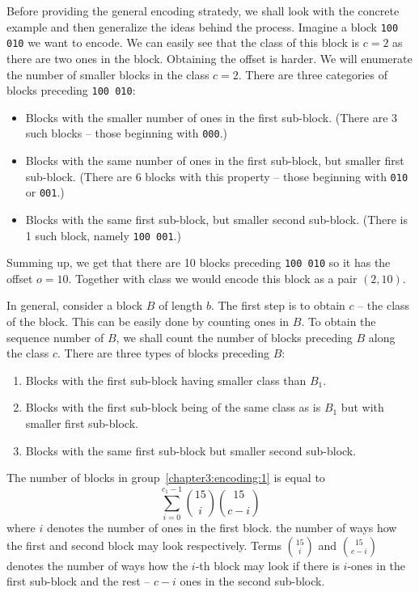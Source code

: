 Before providing the general encoding stratedy, we shall look with the concrete example and then generalize
the ideas behind the process. Imagine a block {\tt 100 010} we want to encode. We can easily see that the
class of this block is $c=2$ as there are two ones in the block. Obtaining the offset is harder. We will
enumerate the number of smaller blocks in the class $c=2$. There are three categories of blocks
preceding {\tt 100 010}:

\begin{itemize}
    \item Blocks with the smaller number of ones in the first sub-block.
    (There are 3 such blocks -- those beginning with {\tt 000}.)
    \item Blocks with the same number of ones in the first sub-block, but smaller first sub-block.
    (There are 6 blocks with this property -- those beginning with {\tt 010} or {\tt 001}.)
    \item Blocks with the same first sub-block, but smaller second sub-block.
    (There is 1 such block, namely {\tt 100 001}.)
\end{itemize}

Summing up, we get that there are 10 blocks preceding {\tt 100 010} so it has the offset $o=10$. Together
with class we would encode this block as a pair $(2, 10)$. 

In general, consider a block $B$ of length $b$. The first step is to obtain $c$ -- the class of the block.
This can be easily done by counting ones in $B$. To obtain the sequence number of $B$, we shall count the
number of blocks preceding $B$ along the class $c$. There are three types of blocks preceding $B$:

\begin{enumerate}
    \item Blocks with the first sub-block having smaller class than $B_1$. \label{chapter3:encoding:1}
    \item Blocks with the first sub-block being of the same class as is $B_1$ but with smaller first sub-block. \label{chapter3:encoding:2}
    \item Blocks with the same first sub-block but smaller second sub-block. \label{chapter3:encoding:3}
\end{enumerate}

The number of blocks in group~\ref{chapter3:encoding:1} is equal to
$$\sum_{i=0}^{c_1-1} {15\choose i} {15\choose c-i}$$ where $i$ denotes the number of ones in the first
block. the number of ways how the first and second block may
look respectively. Terms ${15\choose i}$ and ${15\choose c-i}$ denotes the number of ways how the
$i$-th block may look if there is $i$-ones in the first sub-block and the rest -- $c-i$ ones in the
second sub-block.

